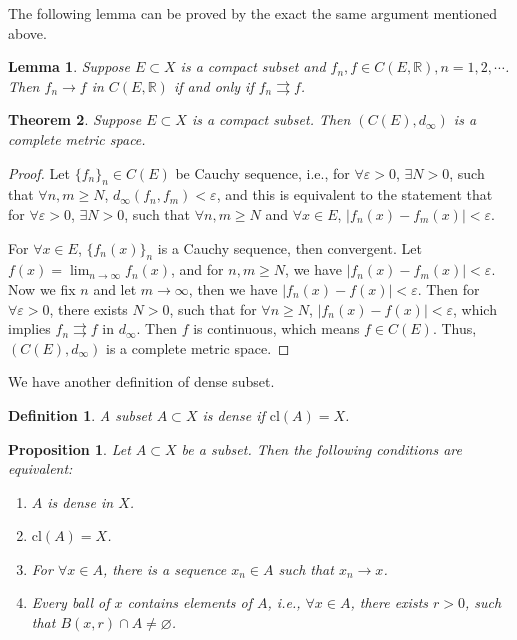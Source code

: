 \documentclass[12pt,leqno]{amsart}
\newtheorem{definition}{Definition}[section]
\newtheorem{theorem}{Theorem}[section]
\newtheorem{lemma}[theorem]{Lemma}
\newtheorem{proposition}{Proposition}[section]
\theoremstyle{definition}
\numberwithin{equation}{subsection}
\begin{document}
The following lemma can be proved by the exact the same argument mentioned above.

\begin{lemma}
Suppose $E\subset X$ is a compact subset and $f_n,f\in C(E,\mathbb{R}), n = 1,2,\cdots$. Then $f_n\to f$ in $C(E,\mathbb{R})$ if and only if $f_n\rightrightarrows f$.
\end{lemma}

\begin{theorem}
Suppose $E\subset X$ is a compact subset. Then $\left(C(E), d_\infty\right)$ is a complete metric space.
\end{theorem}
\begin{proof}
Let $\{f_n\}_n\in C(E)$ be Cauchy sequence, i.e., for $\forall \varepsilon > 0$, $\exists N > 0$, such that $\forall n,m \geq N$, $d_\infty(f_n,f_m) < \varepsilon$, and this is equivalent to the statement that for $\forall \varepsilon > 0$, $\exists N > 0$, such that $\forall n,m \geq N$ and $\forall x\in E$, $\left|f_n(x) - f_m(x)\right| < \varepsilon$. 

For $\forall x\in E$, $\{f_n(x)\}_n$ is a Cauchy sequence, then convergent. Let $f(x) = \lim_{n\to\infty}f_n(x)$, and for $n,m\geq N$, we have $\left|f_n(x) - f_m(x)\right| < \varepsilon$. Now we fix $n$ and let $m\to\infty$, then we have $\left|f_n(x) - f(x)\right| < \varepsilon$. Then for $\forall \varepsilon > 0$, there exists $N > 0$, such that for $\forall n\geq N$, $\left|f_n(x) - f(x)\right| < \varepsilon$, which implies $f_n\rightrightarrows f$ in $d_\infty$. Then $f$ is continuous, which means $f\in C(E)$. Thus, $\left(C(E), d_\infty\right)$ is a complete metric space.
\end{proof}

\medskip

We have another definition of dense subset.

\begin{definition}
A subset $A\subset X$ is dense if $\text{cl}(A) = X$.
\end{definition}

\begin{proposition}
Let $A\subset X$ be a subset. Then the following conditions are equivalent:
\begin{enumerate}
    \item $A$ is dense in $X$.
    \item $\text{cl}(A) = X$.
    \item For $\forall x\in A$, there is a sequence $x_n\in A$ such that $x_n\to x$.
    \item Every ball of $x$ contains elements of $A$, i.e., $\forall x\in A$, there exists $r > 0$, such that $B(x,r)\cap A\neq\varnothing$.
\end{enumerate}
\end{proposition}
\end{document}
